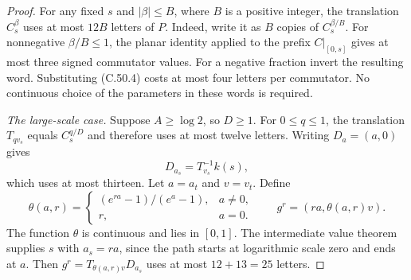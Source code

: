 \begin{proof}
For any fixed $s$ and $|\beta|\leq B$, where $B$ is a
positive integer, the translation $C_s^\beta$ uses at
most $12B$ letters of $P$.
Indeed, write it as $B$ copies of
$C_s^{\beta/B}$.
For nonnegative $\beta/B\leq1$, the planar identity
applied to the prefix $C|_{[0,s]}$ gives at most three
signed commutator values. For a negative fraction invert
the resulting word. Substituting (C.50.4) costs at most
four letters per commutator.
No continuous choice of the parameters in these words
is required.

\emph{The large-scale case.}
Suppose $A\geq\log2$, so $D\geq1$.
For $0\leq q\leq1$, the translation $T_{qv_s}$ equals
$C_s^{q/D}$ and therefore uses at most twelve letters.
Writing $D_a=(a,0)$ gives
\[
                    D_{a_s}=T_{v_s}^{-1}k(s),
                                                        \tag{C.50.5}
\]
which uses at most thirteen.
Let $a=a_t$ and $v=v_t$. Define
\[
 \theta(a,r)=
 \begin{cases}
  (e^{ra}-1)/(e^a-1),&a\ne0,\\
  r,&a=0.
 \end{cases}
 \qquad
       g^r=(ra,\theta(a,r)v).                           \tag{C.50.6}
\]
The function $\theta$ is continuous and lies in $[0,1]$.
The intermediate value theorem supplies $s$ with
$a_s=ra$, since the path starts at logarithmic scale zero
and ends at $a$.
Then
$g^r=T_{\theta(a,r)v}D_{a_s}$ uses at most
$12+13=25$ letters.


\end{proof}

